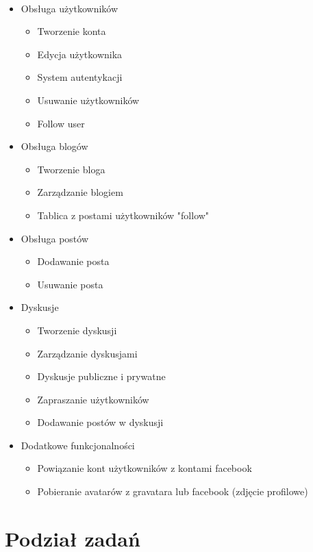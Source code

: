 \documentclass[wide,a4paper,titlepage,12pt] {article}
\begin{document}
  \paragraph{}
  \begin{itemize}
   \item Obsługa użytkowników
   \begin{itemize}
    \item Tworzenie konta
    \item Edycja użytkownika
    \item System autentykacji
    \item Usuwanie użytkowników
    \item Follow user
   \end{itemize}
   \item Obsługa blogów
    \begin{itemize}
      \item Tworzenie bloga
      \item Zarządzanie blogiem
      \item Tablica z postami użytkowników "follow"
    \end{itemize}
   \item Obsługa postów
    \begin{itemize}
      \item Dodawanie posta
      \item Usuwanie posta
    \end{itemize}
  \item Dyskusje
    \begin{itemize}
      \item Tworzenie dyskusji
      \item Zarządzanie dyskusjami
      \item Dyskusje publiczne i prywatne
      \item Zapraszanie użytkowników
      \item Dodawanie postów w dyskusji
    \end{itemize}
  \item Dodatkowe funkcjonalności
    \begin{itemize}
      \item Powiązanie kont użytkowników z kontami facebook
      \item Pobieranie avatarów z gravatara lub facebook (zdjęcie profilowe) 
    \end{itemize}
  \end{itemize}
  \section{Podział zadań}
\end{document}
